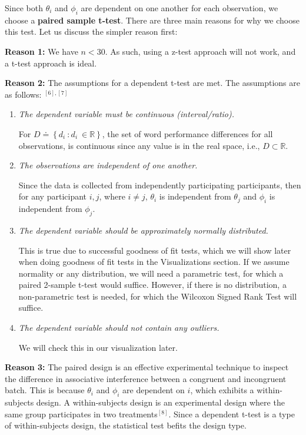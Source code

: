 \documentclass[11pt]{article}
\begin{document}
    Since both \(\theta_{i}\) and \(\phi_{i}\) are dependent on one another
for each observation, we choose a \textbf{paired sample t-test}. There
are three main reasons for why we choose this test. Let us discuss the
simpler reason first:

\textbf{Reason 1:} We have \(n < 30\). As such, using a z-test approach
will not work, and a t-test approach is ideal.

\textbf{Reason 2:} The assumptions for a dependent t-test are met. The
assumptions are as follows: \(^{[6],[7]}\)

\begin{enumerate}
\def\labelenumi{\arabic{enumi}.}
\item
  \emph{The dependent variable must be continuous (interval/ratio).}

  For
  \(D \doteq \left \{ d_{i} \: : d_{i} \: \in \mathbb{R} \right \}\),
  the set of word performance differences for all observations, is
  continuous since any value is in the real space, i.e.,
  \(D \subset \mathbb{R}\).
\item
  \emph{The observations are independent of one another.}

  Since the data is collected from independently participating
  participants, then for any participant \(i, j\), where \(i \neq j\),
  \(\theta_i\) is independent from \(\theta_j\) and \(\phi_i\) is
  independent from \(\phi_j\).
\item
  \emph{The dependent variable should be approximately normally
  distributed.}

  This is true due to successful goodness of fit tests, which we will
  show later when doing goodness of fit tests in the Visualizations
  section. If we assume normality or any distribution, we will need a
  parametric test, for which a paired 2-sample t-test would suffice.
  However, if there is no distribution, a non-parametric test is needed,
  for which the Wilcoxon Signed Rank Test will suffice.
\item
  \emph{The dependent variable should not contain any outliers.}

  We will check this in our visualization later.
\end{enumerate}

\textbf{Reason 3:} The paired design is an effective experimental
technique to inspect the difference in associative interference between
a congruent and incongruent batch. This is because \(\theta_i\) and
\(\phi_i\) are dependent on \(i\), which exhibits a within-subjects
design. A within-subjects design is an experimental design where the
same group participates in two treatments\(^{[8]}\). Since a dependent
t-test is a type of within-subjects design, the statistical test befits
the design type.
\end{document}
